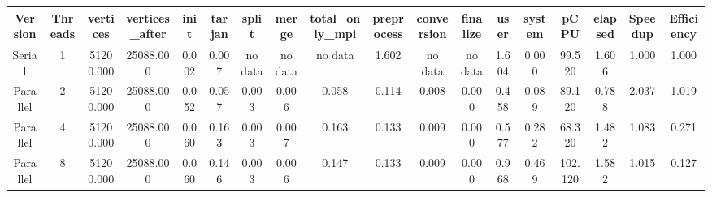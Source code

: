 \begin{tabular}{|c|c|c|c|c|c|c|c|c|c|c|c|c|c|c|c|c|c|}
\toprule
 Version &  Threads &  vertices &  vertices\_after &  init &  tarjan &   split &   merge & total\_only\_mpi &  preprocess & conversion & finalize &  user &  system &    pCPU &  elapsed &  Speedup &  Efficiency \\
\midrule
  Serial &        1 & 51200.000 &       25088.000 & 0.002 &   0.007 & no data & no data &        no data &       1.602 &    no data &  no data & 1.604 &   0.000 &  99.520 &    1.606 &    1.000 &       1.000 \\
Parallel &        2 & 51200.000 &       25088.000 & 0.052 &   0.057 &   0.003 &   0.006 &          0.058 &       0.114 &      0.008 &    0.000 & 0.458 &   0.089 &  89.120 &    0.788 &    2.037 &       1.019 \\
Parallel &        4 & 51200.000 &       25088.000 & 0.060 &   0.163 &   0.003 &   0.007 &          0.163 &       0.133 &      0.009 &    0.000 & 0.577 &   0.282 &  68.320 &    1.482 &    1.083 &       0.271 \\
Parallel &        8 & 51200.000 &       25088.000 & 0.060 &   0.146 &   0.003 &   0.006 &          0.147 &       0.133 &      0.009 &    0.000 & 0.968 &   0.469 & 102.120 &    1.582 &    1.015 &       0.127 \\
\bottomrule
\end{tabular}
